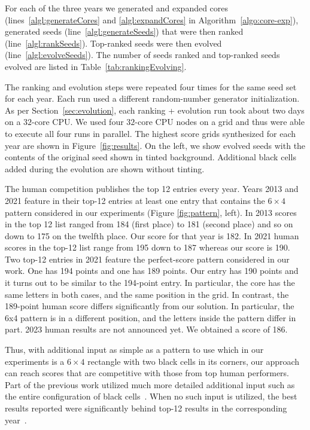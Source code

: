 For each of the three years we generated and expanded cores (lines~\ref{algl:generateCores} and \ref{algl:expandCores} in Algorithm~\ref{algo:core-exp}), generated seeds (line~\ref{algl:generateSeeds}) that were then ranked (line~\ref{algl:rankSeeds}). Top-ranked seeds were then evolved (line~\ref{algl:evolveSeeds}). The number of seeds ranked and top-ranked seeds evolved are listed in Table~\ref{tab:rankingEvolving}.


The ranking and evolution steps were repeated four times for the same seed set for each year. Each run used a different random-number generator initialization. As per Section~\ref{sec:evolution}, each ranking + evolution run took about two days on a $32$-core CPU. We used four $32$-core CPU nodes on a grid and thus were able to execute all four runs in parallel. The highest score grids synthesized for each year are shown in Figure~\ref{fig:results}. On the left, we show evolved seeds with the contents of the original seed shown in tinted background. Additional black cells added during the evolution are shown without tinting.

The human competition publishes the top 12 entries every year.
Years 2013 and 2021 feature in their top-12 entries at least one entry that contains the $6 \times 4$ pattern
considered in our experiments (Figure \ref{fig:pattern}, left).
In 2013 scores in the top 12 list ranged from 184 (first place) to 181 (second place) and so on down to 175 on the twelfth place. 
Our score for that year is 182.
In 2021 human scores in the top-12 list range from 195 down to 187 whereas our score is 190.
Two top-12 entries in 2021 feature the perfect-score pattern considered in our work.
One has 194 points and one has 189 points. 
Our entry has 190 points and it turns out to be similar to the 194-point entry. In particular, the core has the same letters in both cases, and the same position in the grid.
In contrast, the 189-point human score differs significantly from our solution.
In particular, the 6x4 pattern is in a different position, and the letters inside the pattern differ in part.
2023 human results are not announced yet. We obtained a score of 186.

Thus, with additional input as simple as a pattern to use which 
in our experiments
is a $6 \times 4$ rectangle with two black cells in its corners,
our approach can reach scores that are competitive with those from top human performers.
Part of the previous work utilized much more detailed additional input such as the entire configuration of black cells~\cite{DBLP:conf/socs/BoteaB21}.
When no such input is utilized, 
the best results reported were significantly behind top-12 results in the corresponding
year~\cite{DBLP:conf/cig/BulitkoB21,Botea_Bulitko_2022}.




